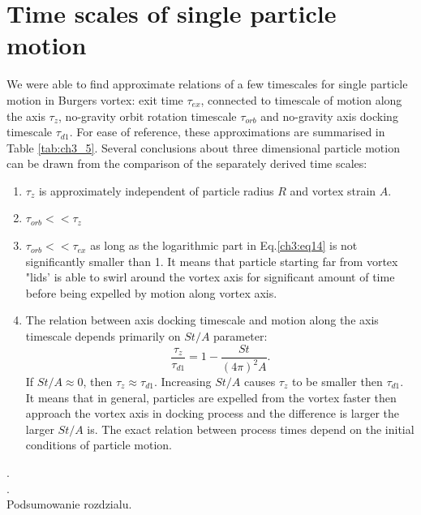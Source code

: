 \documentclass[../main.tex]{subfiles}
\begin{document}
\section{Time scales of single particle motion}
We were able to find approximate relations of a few timescales for single particle motion in Burgers vortex: exit time $\tau_{ex}$, connected to timescale of motion along the axis $\tau_z$, no-gravity orbit rotation timescale $\tau_{orb}$ and no-gravity axis docking timescale $\tau_{d1}$. For ease of reference, these approximations are summarised in Table \ref{tab:ch3_5}. Several conclusions about three dimensional particle motion can be drawn from the comparison of the separately derived time scales:
\begin{enumerate}
\item $\tau_z$ is approximately independent of particle radius $R$ and vortex strain $A$.
\item $\tau_{orb}<<\tau_z$
\item $\tau_{orb}<<\tau_{ex}$ as long as the logarithmic part in Eq.\ref{ch3:eq14} is not significantly smaller than 1. It means that particle starting far from vortex "lids' is able to swirl around the vortex axis for significant amount of time before being expelled by motion along vortex axis.
\item The relation between axis docking timescale and motion along the axis timescale depends primarily on $St/A$ parameter:
\begin{equation}
\frac{\tau_z}{\tau_{d1}} = 1-\frac{St}{(4 \pi)^2 A}.
\label{ch3:eq33}
\end{equation}
If $St/A \approx 0$, then $\tau_z \approx \tau_{d1}$. Increasing $St/A$ causes $\tau_z$ to be smaller then $\tau_{d1}$. It means that in general, particles are expelled from the vortex faster then approach the vortex axis in docking process and the difference is larger the larger $St/A$ is. The exact relation between process times depend on the initial conditions of particle motion.
\end{enumerate} 


%
. \\
. \\

Podsumowanie rozdzialu.
\end{document}
